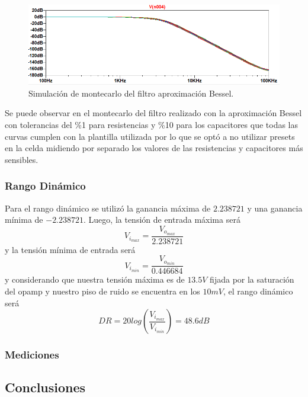 \begin{figure}[H]
\centering
	\centering
	\includegraphics[width=\textwidth]{Imagenes-Ej1/bessel_mont.png}
	\caption{Simulación de montecarlo del filtro aproximación Bessel.}
	\label{bes_mont_sim}
\end{figure}

Se puede observar en el montecarlo del filtro realizado con la aproximación Bessel con tolerancias del \%1  para resistencias y \%10 para los capacitores que todas las curvas cumplen con la plantilla utilizada por lo que se optó a no utilizar presets en la celda midiendo por separado los valores de las resistencias y capacitores más sensibles.

\subsubsection{Rango Dinámico}

Para el rango dinámico se utilizó la ganancia máxima de $2.238721$ y una ganancia mínima de $-2.238721$. Luego, la tensión de entrada máxima será
\begin{equation}
V_{i_{max}}= \frac{V_{o_{max}}}{2.238721}
\end{equation}
y la tensión mínima de entrada será
\begin{equation}
V_{i_{min}}= \frac{V_{o_{min}}}{0.446684}
\end{equation}
y considerando que nuestra tensión máxima es de $13.5V$ fijada por la saturación del opamp y nuestro piso de ruido se encuentra en los $10mV$, el rango dinámico será
\begin{equation}
DR=20log(\frac{V_{i_{max}}}{V_{i_{min}}}) = 48.6dB
\end{equation}


\subsubsection{Mediciones}


\subsection{Conclusiones}



